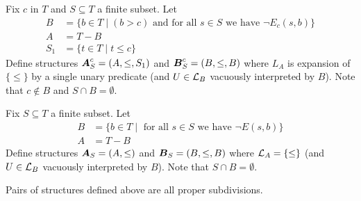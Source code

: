 \documentclass{amsart}
\DeclareMathOperator{\A}{\boldface A}
\DeclareMathOperator{\B}{\boldface B}
\begin{document}
\begin{Definition}
	Fix $c$ in $T$ and $S \subseteq T$ a finite subset. Let
	\begin{align*}
		B &= \{b \in T \mid (b > c) \text{ and for all $s \in S$ we have } \neg E_c(s, b)\} \\
		A &= T - B \\
		S_1 &= \{t \in T \mid t \leq c\}
	\end{align*}
	Define structures $\A^{c}_{S} = (A, \leq, S_1)$ and $\B^{c}_{S} = (B, \leq, B)$ where $L_A$ is expansion of $\{\leq\}$ by a single unary predicate (and $U \in \mathcal L_B$ vacuously interpreted by $B$). Note that $c \notin B$ and $S \cap B = \emptyset$.
\end{Definition}

\begin{Definition}
	Fix $S \subseteq T$ a finite subset. Let
	\begin{align*}
		B &= \{b \in T \mid \text{ for all $s \in S$ we have } \neg E(s, b)\} \\
		A &= T - B
	\end{align*}
	Define structures $\A_{S} = (A, \leq)$ and $\B_{S} = (B, \leq, B)$ where $\mathcal L_A = \{\leq\}$ (and $U \in \mathcal L_B$ vacuously interpreted by $B$). Note that $S \cap B = \emptyset$.
\end{Definition}

\begin{Lemma}
	Pairs of structures defined above are all proper subdivisions.
\end{Lemma}
\end{document}
